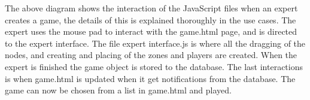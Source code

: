 The above diagram shows the interaction of the JavaScript files when an expert creates a game, the details of this is explained thoroughly in the use cases. The expert uses the mouse pad to interact with the game.html page, and is directed to the expert interface. The file expert interface.js is where all the dragging of the nodes, and creating and placing of the zones and players are created. When the expert is finished the game object is stored to the database. The last interactions is when game.html is updated when it get notifications from the database. The game can now be chosen from a list in game.html and played. \\


